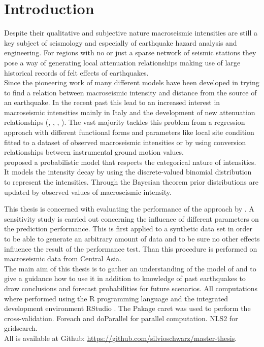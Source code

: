 
\chapter{Introduction} %

\label{Chapter1} %


Despite their qualitative and subjective nature macroseismic intensities are still a key subject of seismology and especially of earthquake hazard analysis and engineering. For regions with no or just a sparse network of seismic stations they pose a way of generating local attenuation relationships making use of large historical records of felt effects of earthquakes.\\
Since the pioneering work of \cite{Koveslighety1906} many different models have been developed in trying to find a relation between macroseismic intensity and distance from the source of an earthquake. In the recent past this lead to an increased interest in macroseismic intensities mainly in Italy and the development of new attenuation relationships (\cite{Albarello2004}, \cite{Carletti2003}, \cite{Gasperini2001}, \cite{Pasolini2008}). The vast majority tackles this problem from a regression approach with different functional forms and parameters like local site condition  fitted to a dataset of observed macroseismic intensities or by using conversion relationships between instrumental ground motion values.\\
\cite{Rotondi2004} proposed a probabilistic model that respects the categorical nature of intensities. It models the intensity decay by using the discrete-valued binomial distribution to represent the intensities. Through the Bayesian theorem prior distributions are updated by observed values of macroseismic intensity.

This thesis is concerned with evaluating the performance of the approach by \cite{Rotondi2004}. A sensitivity study is carried out concerning the influence of  different parameters on the prediction performance. This is first applied to a synthetic data set in order to be able to generate an arbitrary amount of data and to be sure no other effects influence the result of the performance test. Than this procedure is performed on macroseismic data from Central Asia.\\
The main aim of this thesis is to gather an understanding of the model of \cite{Rotondi2004} and to give a guidance how to use it in addition to knowledge of past earthquakes to draw conclusions and forecast probabilities for future scenarios. All computations where performed using the R programming language \citep{R} and the integrated development environment RStudio \citep{RStudio}. The Pakage caret \citep{caret} was used to perform the cross-validation. Foreach\citep{foreach} and doParallel \citep{doParallel} for parallel computation. NLS2 \citep{nls2} for gridsearch.\\
All is available at Github: \href{ https://github.com/silvioschwarz/master-thesis}{ https://github.com/silvioschwarz/master-thesis}.